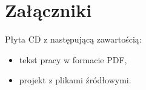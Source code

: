\chapter{Załączniki}

Płyta CD z następującą zawartością:
\begin{itemize}
	\item tekst pracy w formacie PDF,
	\item projekt z plikami źródłowymi.
\end{itemize}